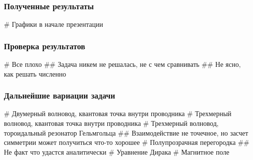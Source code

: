 \documentclass{beamer}
\begin{document}
\begin{frame}[fragile]
\frametitle{Полученные результаты}
\begin{easylist}[itemize]
# Графики в начале презентации
\end{easylist}
\end{frame}


\begin{frame}[fragile]
\frametitle{Проверка результатов}
\begin{easylist}[itemize]
# Все плохо
## Задача никем не решалась, не с чем сравнивать
## Не ясно, как решать численно
\end{easylist}
\end{frame}


\begin{frame}[fragile]
\frametitle{Дальнейшие вариации задачи}
\begin{easylist}[itemize]
# Двумерный волновод, квантовая точка внутри проводника
# Трехмерный волновод, квантовая точка внутри проводника
# Трехмерный волновод, тороидальный резонатор Гельмгольца
## Взаимодействие не точечное, но засчет симметрии может получиться что-то хорошее
# Полупрозрачная перегородка 
## Не факт что удастся аналитически
# Уравнение Дирака
# Магнитное поле
\end{easylist}
\end{frame}
\end{document}
